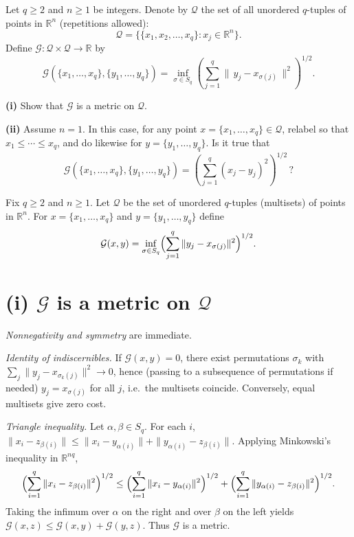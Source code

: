 \documentclass[12pt,a4paper]{article}
\theoremstyle{plain}
\theoremstyle{definition}
\theoremstyle{remark}
\theoremstyle{remark}
\begin{document}
Let $q\ge 2$ and $n\ge 1$ be integers. Denote by $\mathcal{Q}$ the set of all unordered
$q$-tuples of points in $\mathbb{R}^n$ (repetitions allowed):
\[
\mathcal{Q}=\bigl\{\{x_1,x_2,\dots,x_q\}: x_j\in\mathbb{R}^n\bigr\}.
\]
Define $\mathcal{G}:\mathcal{Q}\times\mathcal{Q}\to\mathbb{R}$ by
\[
\mathcal{G}\!\left(\{x_1,\dots,x_q\},\{y_1,\dots,y_q\}\right)
=\inf_{\sigma\in S_q}\left(\sum_{j=1}^{q}\|\,y_j-x_{\sigma(j)}\,\|^{2}\right)^{1/2}.
\]

\smallskip

\noindent\textbf{(i)} Show that $\mathcal{G}$ is a metric on $\mathcal{Q}$.

\smallskip

\noindent\textbf{(ii)} Assume $n=1$. In this case, for any point
$x=\{x_1,\dots,x_q\}\in\mathcal{Q}$, relabel so that $x_1\le \cdots \le x_q$, and do likewise for
$y=\{y_1,\dots,y_q\}$. Is it true that
\[
\mathcal{G}\!\left(\{x_1,\dots,x_q\},\{y_1,\dots,y_q\}\right)
=\left(\sum_{j=1}^{q}(x_j-y_j)^2\right)^{1/2}\,?
\]

Fix $q\ge2$ and $n\ge1$. Let $\mathcal Q$ be the set of unordered $q$-tuples (multisets) of points in $\mathbb{R}^n$.
For $x=\{x_1,\dots,x_q\}$ and $y=\{y_1,\dots,y_q\}$ define
\[
\mathcal G(x,y)=\inf_{\sigma\in S_q}\Bigl(\sum_{j=1}^q \|y_j-x_{\sigma(j)}\|^2\Bigr)^{1/2}.
\]

\smallskip

\section*{(i) $\mathcal G$ is a metric on $\mathcal Q$}

\noindent\emph{Nonnegativity and symmetry} are immediate.

\smallskip

\noindent\emph{Identity of indiscernibles.}
If $\mathcal G(x,y)=0$, there exist permutations $\sigma_k$ with
$\sum_j\|y_j-x_{\sigma_k(j)}\|^2\to 0$, hence (passing to a subsequence of permutations if needed)
$y_j=x_{\sigma(j)}$ for all $j$, i.e.\ the multisets coincide.
Conversely, equal multisets give zero cost.

\smallskip

\noindent\emph{Triangle inequality.}
Let $\alpha,\beta\in S_q$. For each $i$,
$\|x_i-z_{\beta(i)}\|\le \|x_i-y_{\alpha(i)}\|+\|y_{\alpha(i)}-z_{\beta(i)}\|$.
Applying Minkowski’s inequality in $\mathbb{R}^{nq}$,
\[
\Bigl(\sum_{i=1}^q \|x_i-z_{\beta(i)}\|^2\Bigr)^{1/2}
\le
\Bigl(\sum_{i=1}^q \|x_i-y_{\alpha(i)}\|^2\Bigr)^{1/2}
+
\Bigl(\sum_{i=1}^q \|y_{\alpha(i)}-z_{\beta(i)}\|^2\Bigr)^{1/2}.
\]
Taking the infimum over $\alpha$ on the right and over $\beta$ on the left yields
$\mathcal G(x,z)\le \mathcal G(x,y)+\mathcal G(y,z)$.
Thus $\mathcal G$ is a metric.
\end{document}
